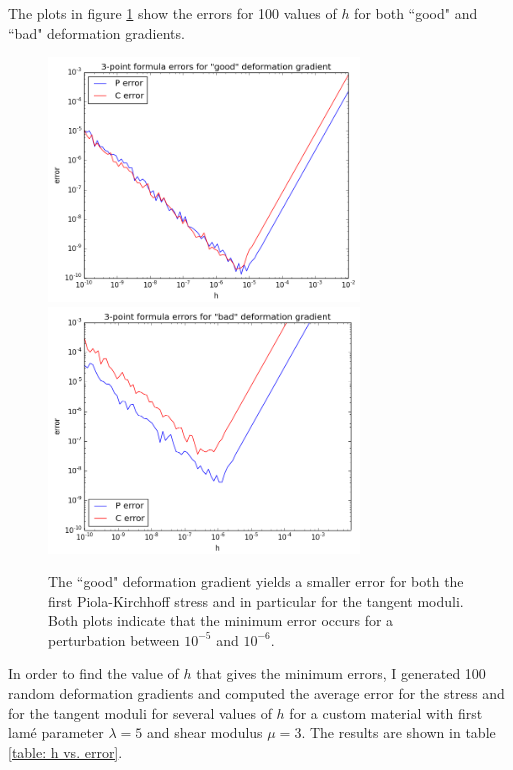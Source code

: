 \documentclass[]{spie}  %
\begin{document}
The plots in figure \ref{fig: numerical differentiation error} show the errors for 100 values of $h$ for both ``good" and ``bad" deformation gradients. 

\begin{figure}[h]
	\centering
	\includegraphics[width=3.25in]{error_good_F.png} \quad
	\includegraphics[width=3.25in]{error_bad_F.png} 
	\caption{The ``good" deformation gradient yields a smaller error for both the first Piola-Kirchhoff stress and in particular for the tangent moduli. Both plots indicate that the minimum error occurs for a perturbation between $10^{-5}$ and $10^{-6}$.} 
	\label{fig: numerical differentiation error}
\end{figure}

In order to find the value of $h$ that gives the minimum errors, I generated 100 random deformation gradients and computed the average error for the stress and for the tangent moduli for several values of $h$ for a custom material with first lam\'e parameter $\lambda = 5$ and shear modulus $\mu = 3$. The results are shown in table \ref{table: h vs. error}.
\end{document}
